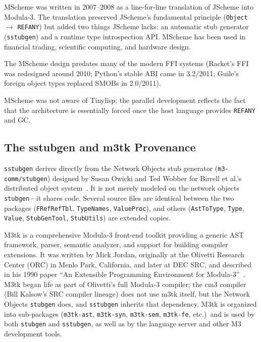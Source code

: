 \documentclass[11pt]{article}
\begin{document}
MScheme was written in 2007--2008 as a line-for-line translation of
JScheme into Modula-3.  The translation preserved JScheme's
fundamental principle (\texttt{Object} $\to$ \texttt{REFANY}) but
added two things JScheme lacks: an automatic stub generator
(\texttt{sstubgen}) and a runtime type introspection API.  MScheme has
been used in financial trading, scientific computing, and hardware
design.

The MScheme design predates many of the modern FFI systems (Racket's
FFI was redesigned around 2010; Python's stable ABI came in 3.2/2011;
Guile's foreign object types replaced SMOBs in 2.0/2011).

MScheme was not aware of Tinylisp; the parallel development reflects
the fact that the architecture is essentially forced once the host
language provides \texttt{REFANY} and GC.


\subsection{The sstubgen and m3tk Provenance}
\label{sec:sstubgen-provenance}

\texttt{sstubgen} derives directly from the Network Objects stub
generator (\texttt{m3-comm/stubgen}) designed by Susan Owicki and Ted
Wobber for Birrell et al.'s distributed object
system~\cite{birrell1994}.  It is not merely modeled on the network
objects \texttt{stubgen}---it shares code.  Several source files are
identical between the two packages (\texttt{FRefRefTbl},
\texttt{TypeNames}, \texttt{ValueProc}), and others
(\texttt{AstToType}, \texttt{Type}, \texttt{Value},
\texttt{StubGenTool}, \texttt{StubUtils}) are extended copies.

M3tk is a comprehensive Modula-3 front-end toolkit providing a generic
AST framework, parser, semantic analyzer, and support for building
compiler extensions.  It was written by Mick Jordan, originally at the
Olivetti Research Center (ORC) in Menlo Park, California, and later at
DEC SRC, and described in his 1990 paper ``An Extensible Programming
Environment for Modula-3''~\cite{jordan1990}.  M3tk began life as part
of Olivetti's full Modula-3 compiler; the cm3 compiler (Bill Kalsow's
SRC compiler lineage) does not use m3tk itself, but the Network
Objects \texttt{stubgen} does, and \texttt{sstubgen} inherits that
dependency.  M3tk is organized into sub-packages (\texttt{m3tk-ast},
\texttt{m3tk-syn}, \texttt{m3tk-sem}, \texttt{m3tk-fe}, etc.)\ and is
used by both \texttt{stubgen} and \texttt{sstubgen}, as well as by
the language server and other M3 development tools.
\end{document}

